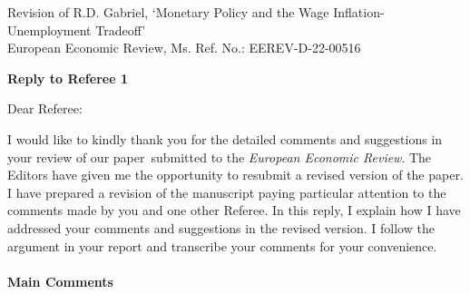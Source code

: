 \documentclass[12pt]{article}
\begin{document}
\noindent Revision of R.D. Gabriel, `Monetary Policy and the Wage Inflation-Unemployment Tradeoff' \\
\noindent European Economic Review, Ms. Ref. No.: EEREV-D-22-00516 \bigskip

\begin{center}
\textbf{Reply to Referee 1}
\end{center}

\bigskip

\noindent Dear Referee:

\noindent I would like to kindly thank you for the detailed comments and suggestions in your review of our paper\ submitted to the \textit{European Economic Review}. The Editors have given me the opportunity to resubmit a revised version of the paper. I have prepared a revision of the manuscript paying particular attention to the comments made by you and one other Referee. In this reply, I explain how I have addressed your comments and suggestions in the revised version. I follow the argument in your report and transcribe your comments for your convenience.

\bigskip

\paragraph{Main Comments}
\end{document}

